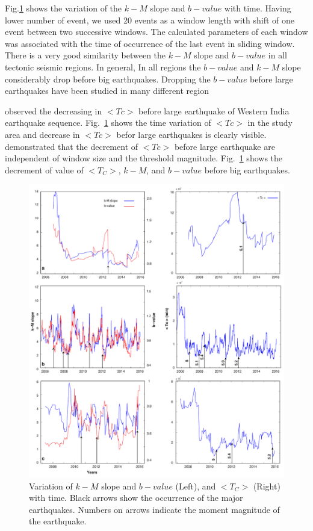\noindent 
Fig.\ref{fig:tc}  shows the variation of the $k-M$ slope and $b-value$ with time. Having lower number of event, we used 20 events as a window length with shift of one event between two successive windows. The calculated parameters of each window was associated with the time of occurrence of the last event in sliding window. There is a very good similarity between the $k-M$ slope and $b-value$ in all tectonic seismic regions. In general, In all regions the $b-value$ and $k-M$ slope considerably drop before big earthquakes. Dropping the $b-value$ before large earthquakes have been studied in many different region \citep[e.g.][]{Wyss2000,Wyss2006,Schorlemmer2005,Chan2012}

\noindent
\citet{Telesca2016} observed the decreasing in $<Tc>$ before large earthquake of Western India earthquake sequence. Fig.~\ref{fig:tc} shows the time variation of $<Tc>$ in the study area and decrease in $<Tc>$ befor large earthquakes is clearly visible. \citet{Telesca2016} demonstrated that the decrement of $<Tc>$ before large earthquake are independent of window size and the threshold magnitude. Fig.~\ref{fig:tc} shows the decrement of value of $< T_C >$, $k-M$, and $b-value$ before big earthquakes.
 
 \begin{figure} [ht]
\centering
\includegraphics[scale=0.34]{figures/pdf/Figure08.pdf} 
\caption{ Variation of $k-M$ slope  and $b-value$ (Left), and $ < T_C >$ (Right) with time. Black arrows show the occurrence of the major earthquakes. Numbers on arrows indicate the moment magnitude of the earthquake.}
\label{fig:tc}
\end{figure}
 
 
 
 
 
 
 